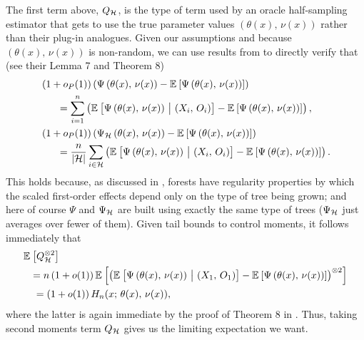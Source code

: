 \documentclass[aos]{imsart}
\theoremstyle{plain}
\theoremstyle{definition}
\theoremstyle{remark}
\begin{document}
\begin{CJK}{UTF8}{gbsn}
\begin{appendix}
The first term above, $Q_{\mathcal{H}}$, is the type of term used by an oracle half-sampling estimator that gets to use the
true parameter values $(\theta(x), \, \nu(x))$ rather than their plug-in analogues.
Given our assumptions and because $(\theta(x), \, \nu(x))$ is non-random, we can use results from
\citet{wager2015estimation} to directly verify that (see their Lemma 7 and Theorem 8)
\begin{equation}
\label{eq:hajek}
\begin{split}
&\p{1 + o_P(1)}\p{\Psi\p{\theta(x), \, \nu(x)} - \EE{\Psi\p{\theta(x), \, \nu(x)}}} \\
&\ \ \ \ \  = \sum_{i = 1}^n \p{\EE{\Psi\p{\theta(x), \, \nu(x)} \cond \p{X_i, \, O_i}} - \EE{\Psi\p{\theta(x), \, \nu(x)}}}, \\
&\p{1 + o_P(1)} \p{\Psi_{\hh}\p{\theta(x), \, \nu(x)} - \EE{\Psi\p{\theta(x), \, \nu(x)}}} \\
&\ \ \ \ \ = \frac{n}{\abs{\hh}} \sum_{i \in \hh} \p{\EE{\Psi\p{\theta(x), \, \nu(x)} \cond \p{X_i, \, O_i}} - \EE{\Psi\p{\theta(x), \, \nu(x)}}}.
\end{split}
\end{equation}
This holds because, as discussed in \citet{wager2015estimation}, forests
have regularity properties by which the scaled first-order effects
depend only on the type of tree being grown; and here of course $\Psi$ and $\Psi_{\mathcal{H}}$
are built using exactly the same type of trees ($\Psi_{\mathcal{H}}$ just averages over fewer of them).
Given tail bounds to control moments, it follows immediately that
\begin{align*}
&\EE{Q_{\hh}^{\otimes 2}} \\
&\ \ = n\p{1 + o(1)} \EE{ \p{\EE{\Psi\p{\theta(x), \, \nu(x)} \cond \p{X_1, \, O_1}} - \EE{\Psi\p{\theta(x), \, \nu(x)}}}^{\otimes 2}} \\
&\ \ \ = \p{1 + o(1)} H_n(x; \, \theta(x), \, \nu(x)),
\end{align*}
where the latter is again immediate by the proof of Theorem 8 in \citet{wager2015estimation}.
Thus, taking second moments term $Q_{\mathcal{H}}$ gives us the limiting expectation we want.


\end{appendix}
\end{CJK}
\end{document}
